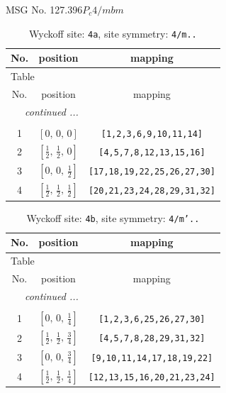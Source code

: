 \documentclass[fleqn,8pt]{jsarticle}
\begin{document}
\setcounter{MaxMatrixCols}{32}

\renewcommand{\tablename}{Table~}
\renewcommand{\figurename}{Figure~}
\begin{center}
\LARGE
MSG No. 127.396\quad$P_{c}4/mbm$
\end{center}
\renewcommand{\arraystretch}{1.2}
\begin{longtable}{ccc}
\caption{Wyckoff site: {\tt 4a}, site symmetry: {\tt 4/m..}}
 \\
 \hline \hline
No. & position & mapping \\ \hline \endfirsthead

\multicolumn{2}{l}{\tablename\ \thetable{}} \\
 \hline \hline
No. & position & mapping \\ \hline \endhead

 \hline \hline
\multicolumn{2}{r}{\footnotesize\it continued ...} \\ \endfoot

 \hline \hline
\multicolumn{2}{r}{} \\ \endlastfoot

1 & $\left[ 0,\, 0,\, 0 \right]$ & {\tt [1,2,3,6,9,10,11,14]} \\ \hline
2 & $\left[ \frac{1}{2},\, \frac{1}{2},\, 0 \right]$ & {\tt [4,5,7,8,12,13,15,16]} \\ \hline
3 & $\left[ 0,\, 0,\, \frac{1}{2} \right]$ & {\tt [17,18,19,22,25,26,27,30]} \\ \hline
4 & $\left[ \frac{1}{2},\, \frac{1}{2},\, \frac{1}{2} \right]$ & {\tt [20,21,23,24,28,29,31,32]} \\
\end{longtable}
\renewcommand{\arraystretch}{1.2}
\begin{longtable}{ccc}
\caption{Wyckoff site: {\tt 4b}, site symmetry: {\tt 4/m'..}}
 \\
 \hline \hline
No. & position & mapping \\ \hline \endfirsthead

\multicolumn{2}{l}{\tablename\ \thetable{}} \\
 \hline \hline
No. & position & mapping \\ \hline \endhead

 \hline \hline
\multicolumn{2}{r}{\footnotesize\it continued ...} \\ \endfoot

 \hline \hline
\multicolumn{2}{r}{} \\ \endlastfoot

1 & $\left[ 0,\, 0,\, \frac{1}{4} \right]$ & {\tt [1,2,3,6,25,26,27,30]} \\ \hline
2 & $\left[ \frac{1}{2},\, \frac{1}{2},\, \frac{3}{4} \right]$ & {\tt [4,5,7,8,28,29,31,32]} \\ \hline
3 & $\left[ 0,\, 0,\, \frac{3}{4} \right]$ & {\tt [9,10,11,14,17,18,19,22]} \\ \hline
4 & $\left[ \frac{1}{2},\, \frac{1}{2},\, \frac{1}{4} \right]$ & {\tt [12,13,15,16,20,21,23,24]} \\
\end{longtable}
\end{document}
